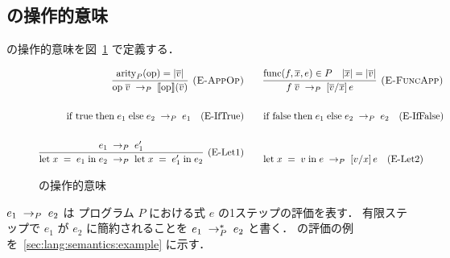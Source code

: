 \subsection{\Yil の操作的意味}

\par \Yil の操作的意味を図~\ref{fig:lang:semantics} で定義する．

\begin{figure}[H]
  \begin{align*}
    \infer[\ERuleAppOp] {
      \Reduce{P}{\App{\mathrm{op}}{\seq{v}}}{\sem{\mathrm{op}}\paren{\seq{v}}}
    } {
      \arity{P}{\mathrm{op}} = |\seq{v}|
    } & \quad\quad
    \infer[\ERuleAppFunc] {
      \Reduce{P}{\App{f}{\seq{v}}}{\subst{\seq{v}}{\seq{x}}{e}}
    } {
      \Func{f}{\seq{x}}{e} \in P
      & |\seq{x}| = |\seq{v}|
    } \\\\
    \Reduce{P}{\If{\true}{e_1}{e_2}}{e_1} \quad \ERuleIfTrue & \quad\quad
    \Reduce{P}{\If{\false}{e_1}{e_2}}{e_2} \quad \ERuleIfFalse \\\\
    \infer[\ERuleLetCtx] {
      \Reduce{P}{\Let{x}{e_1}{e_2}}{\Let{x}{e'_1}{e_2}}
    } {
      \Reduce{P}{e_1}{e'_1}
    } & \quad\quad
    \Reduce{P}{\Let{x}{v}{e}}{\subst{v}{x}{e}} \quad \ERuleLetSubst
  \end{align*}

  \caption{\Yil の操作的意味}
  \label{fig:lang:semantics}
\end{figure}

\par $\Reduce{P}{e_1}{e_2}$ は プログラム $P$ における式 $e$ の1ステップの評価を表す．
有限ステップで $e_1$ が $e_2$ に簡約されることを $\MultiReduce{P}{e_1}{e_2}$ と書く．
\Yil の評価の例を~\ref{sec:lang:semantics:example} に示す．

